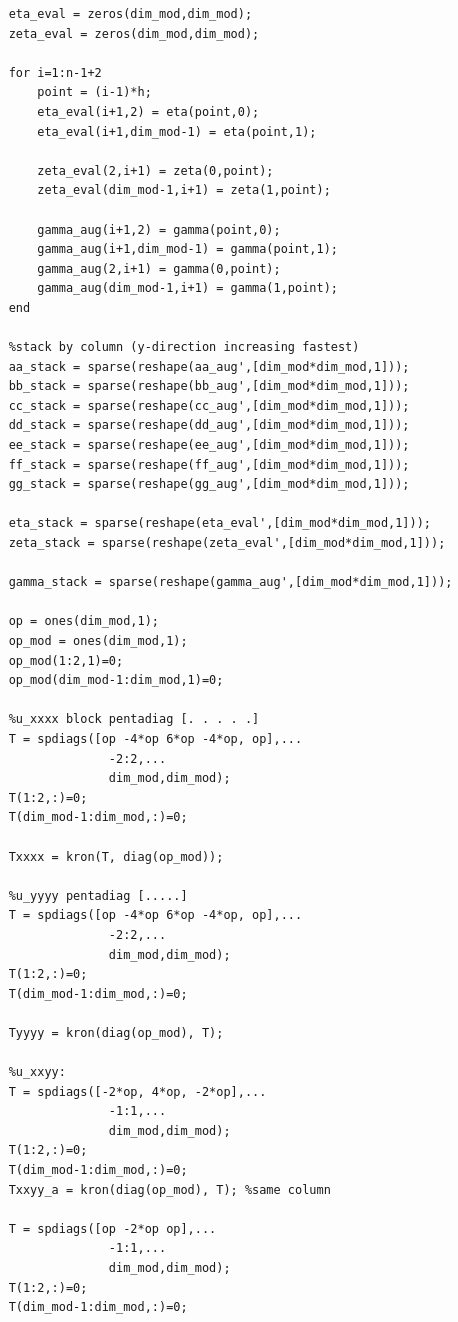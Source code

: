 \documentclass[12pt,letter]{article}
\begin{document}
\begin{enumerate}
\begin{enumerate}
\begin{verbatim}
    eta_eval = zeros(dim_mod,dim_mod);
    zeta_eval = zeros(dim_mod,dim_mod);
    
    for i=1:n-1+2
        point = (i-1)*h;
        eta_eval(i+1,2) = eta(point,0);
        eta_eval(i+1,dim_mod-1) = eta(point,1);
        
        zeta_eval(2,i+1) = zeta(0,point);
        zeta_eval(dim_mod-1,i+1) = zeta(1,point);
        
        gamma_aug(i+1,2) = gamma(point,0);
        gamma_aug(i+1,dim_mod-1) = gamma(point,1);
        gamma_aug(2,i+1) = gamma(0,point);
        gamma_aug(dim_mod-1,i+1) = gamma(1,point);
    end
    
    %stack by column (y-direction increasing fastest)
    aa_stack = sparse(reshape(aa_aug',[dim_mod*dim_mod,1]));
    bb_stack = sparse(reshape(bb_aug',[dim_mod*dim_mod,1]));
    cc_stack = sparse(reshape(cc_aug',[dim_mod*dim_mod,1]));
    dd_stack = sparse(reshape(dd_aug',[dim_mod*dim_mod,1]));
    ee_stack = sparse(reshape(ee_aug',[dim_mod*dim_mod,1]));
    ff_stack = sparse(reshape(ff_aug',[dim_mod*dim_mod,1]));
    gg_stack = sparse(reshape(gg_aug',[dim_mod*dim_mod,1]));
    
    eta_stack = sparse(reshape(eta_eval',[dim_mod*dim_mod,1]));
    zeta_stack = sparse(reshape(zeta_eval',[dim_mod*dim_mod,1]));
    
    gamma_stack = sparse(reshape(gamma_aug',[dim_mod*dim_mod,1]));
    
    op = ones(dim_mod,1);
    op_mod = ones(dim_mod,1);
    op_mod(1:2,1)=0;
    op_mod(dim_mod-1:dim_mod,1)=0;
    
    %u_xxxx block pentadiag [. . . . .]
    T = spdiags([op -4*op 6*op -4*op, op],...
                  -2:2,...
                  dim_mod,dim_mod);
    T(1:2,:)=0;
    T(dim_mod-1:dim_mod,:)=0;
    
    Txxxx = kron(T, diag(op_mod));

    %u_yyyy pentadiag [.....]
    T = spdiags([op -4*op 6*op -4*op, op],...
                  -2:2,...
                  dim_mod,dim_mod);
    T(1:2,:)=0;
    T(dim_mod-1:dim_mod,:)=0;
    
    Tyyyy = kron(diag(op_mod), T);

    %u_xxyy:
    T = spdiags([-2*op, 4*op, -2*op],...
                  -1:1,...
                  dim_mod,dim_mod);
    T(1:2,:)=0;
    T(dim_mod-1:dim_mod,:)=0;
    Txxyy_a = kron(diag(op_mod), T); %same column

    T = spdiags([op -2*op op],...
                  -1:1,...
                  dim_mod,dim_mod);
    T(1:2,:)=0;
    T(dim_mod-1:dim_mod,:)=0;


\end{verbatim}
\end{enumerate}
\end{enumerate}
\end{document}
